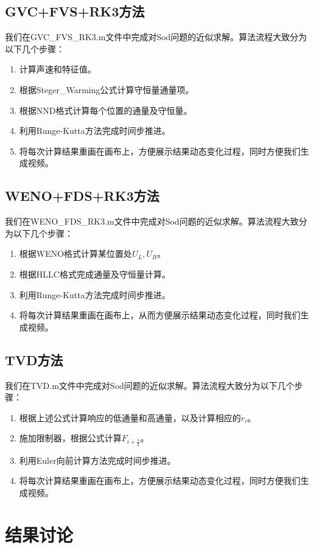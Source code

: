 \documentclass[12pt,a4paper]{article}%
\begin{document}
		\subsection{GVC+FVS+RK3方法}
		我们在GVC\_FVS\_RK3.m文件中完成对Sod问题的近似求解。算法流程大致分为以下几个步骤：
		\begin{enumerate}
			\item 计算声速和特征值。
			\item 根据Steger\_Warming公式计算守恒量通量项。
			\item 根据NND格式计算每个位置的通量及守恒量。
			\item 利用Runge-Kutta方法完成时间步推进。
			\item 将每次计算结果重画在画布上，方便展示结果动态变化过程，同时方便我们生成视频。
		\end{enumerate}
		
		\subsection{WENO+FDS+RK3方法}
		我们在WENO\_FDS\_RK3.m文件中完成对Sod问题的近似求解。算法流程大致分为以下几个步骤：
		\begin{enumerate}
			\item 根据WENO格式计算某位置处$U_L,U_R$。
			\item 根据HLLC格式完成通量及守恒量计算。
			\item 利用Runge-Kutta方法完成时间步推进。
			\item 将每次计算结果重画在画布上，从而方便展示结果动态变化过程，同时我们生成视频。
		\end{enumerate}
		
		\subsection{TVD方法}
		我们在TVD.m文件中完成对Sod问题的近似求解。算法流程大致分为以下几个步骤：
		\begin{enumerate}
			\item 根据上述公式计算响应的低通量和高通量，以及计算相应的$r_i$。
			\item 施加限制器，根据公式计算$F_{i+\frac12}$。
			\item 利用Euler向前计算方法完成时间步推进。
			\item 将每次计算结果重画在画布上，方便展示结果动态变化过程，同时方便我们生成视频。
		\end{enumerate}

	\section{结果讨论}
\end{document}
